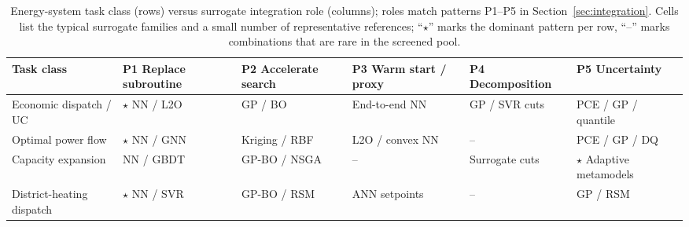 
\begin{table}[!t]
  \centering
  \scriptsize
  \caption{Energy-system task class (rows) versus surrogate integration
  role (columns); roles match patterns P1--P5 in
  Section~\ref{sec:integration}. Cells list the typical surrogate
  families and a small number of representative references; ``$\star$''
  marks the dominant pattern per row, ``--'' marks combinations that
  are rare in the screened pool.}
  \label{tab:T2-task-role}
  \renewcommand{\arraystretch}{1.25}
  \begin{tabularx}{\textwidth}{@{}L{0.16\textwidth} L{0.18\textwidth} L{0.16\textwidth} L{0.16\textwidth} L{0.14\textwidth} L{0.14\textwidth}@{}}
    \toprule
    Task class & P1 Replace subroutine & P2 Accelerate search & P3 Warm start / proxy & P4 Decomposition & P5 Uncertainty \\
    \midrule
    Economic dispatch / UC
      & $\star$ NN / L2O \cite{Wu2022231,Chen20244723,Pang2023}
      & GP / BO \cite{Nikolaidis2021,Liang2024__2}
      & End-to-end NN \cite{Wu2024391,Wang20211767}
      & GP / SVR cuts \cite{Shao201858,Amjady2017}
      & PCE / GP / quantile \cite{Hu2020,Hu2021671,Safta20172535} \\
    Optimal power flow
      & $\star$ NN / GNN \cite{Chen20244723,Chen2022,Park2019,Su2022315}
      & Kriging / RBF \cite{Liu20223726,Mahapatra2022721}
      & L2O / convex NN \cite{Liu20242534,Liang20246508}
      & --
      & PCE / GP / DQ \cite{Muhlpfordt20194806,Koirala20242284,Chen2023657} \\
    Capacity expansion
      & NN / GBDT \cite{Jahangiri20244849,Jahangiri2023}
      & GP-BO / NSGA \cite{Han2018622,Pérez-Uresti2023}
      & --
      & Surrogate cuts \cite{Zhang2025__4,abbas_optimal_2024}
      & $\star$ Adaptive metamodels \cite{Amaral20251156,Fu20202904,Kim2021} \\
    District-heating dispatch
      & $\star$ NN / SVR \cite{Koschwitz2018134,Bianchi2020244,Sánchez-Zabala2024}
      & GP-BO / RSM \cite{Schulte2016104,Petrova2025,Du2025}
      & ANN setpoints \cite{Reynolds2017704,Hirvonen2017323}
      & --
      & GP / RSM \cite{Simonson202036,Reich2020} \\

\end{tabularx}
\end{table}
